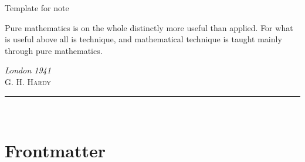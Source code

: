 \documentclass{note}
\begin{document}
\begin{titlepage}
\noindent
\titlefont Template for note\par
\epigraph{Pure mathematics is on the whole distinctly more useful than applied. For what is useful above all is technique, and mathematical technique is taught mainly through pure mathematics.}%
{\textit{London 1941}\\ \textsc{G. H. Hardy}}
\null\vfill
\vspace*{1cm}
\noindent
\hfill
\begin{minipage}{0.5\linewidth}
    \begin{flushright}
        \printauthor
    \end{flushright}
\end{minipage}
%
\begin{minipage}{0.02\linewidth}
    \rule{1pt}{60pt}
\end{minipage}
\titlepagedecoration

\clearpage
~
\thispagestyle{empty}
\clearpage
\end{titlepage}



%

{
    \hypersetup{linkcolor=red!65!black} %
    \tableofcontents
}

\frontmatter

% 

\chapter{Frontmatter}
\lipsum[5-10]

\mainmatter
\end{document}
